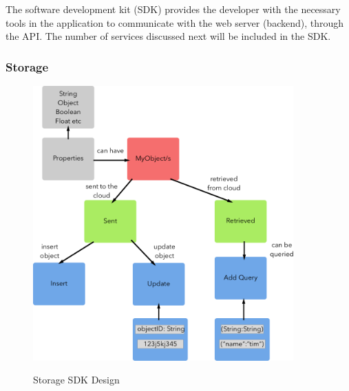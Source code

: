 The software development kit (SDK) provides the developer with the necessary tools in the application to communicate with the web server (backend), through the API. The number of services discussed next will be included in the SDK.

\subsubsection{Storage}


\begin{figure}[!h]
    \caption{Storage SDK Design}
    \centering
    \includegraphics[width=100mm]{images/design/objects}
    \label{fig:sdk_storage}
\end{figure}

